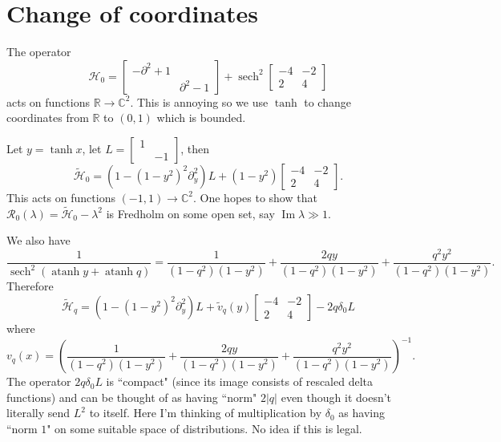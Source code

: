 \documentclass[12pt]{report}
\newcommand{\RR}{\mathbb{R}}
\newcommand{\CC}{\mathbb{C}}
\DeclareMathOperator{\atanh}{atanh}
\DeclareMathOperator{\sech}{sech}
\renewcommand{\Im}{\operatorname{Im}}
\theoremstyle{definition}
\begin{document}
\section{Change of coordinates}
The operator
$$\mathcal H_0 = \begin{bmatrix}-\partial^2 + 1 \\&\partial^2 - 1\end{bmatrix} + \sech^2 \begin{bmatrix}-4 & -2\\2 & 4\end{bmatrix}$$
acts on functions $\RR \to \CC^2$. This is annoying so we use $\tanh$ to change coordinates from $\RR$ to $(0, 1)$ which is bounded.

Let $y = \tanh x$, let $L = \begin{bmatrix}1 & \\ &-1\end{bmatrix}$, then
$$\mathcal{\tilde H}_0 = \left(1 - (1 - y^2)^2 \partial_y^2\right)L + (1 - y^2)\begin{bmatrix}-4 & -2\\2 & 4\end{bmatrix}.$$
This acts on functions $(-1, 1) \to \CC^2$.
One hopes to show that $\mathcal R_0(\lambda) = \mathcal{\tilde H}_0 - \lambda^2$ is Fredholm on some open set, say $\Im \lambda \gg 1$.

We also have
$$\frac{1}{\sech^2(\atanh y + \atanh q)} = \frac{1}{(1 - q^2)(1 - y^2)} + \frac{2qy}{(1 - q^2)(1 - y^2)} + \frac{q^2y^2}{(1 - q^2)(1 - y^2)}.$$
Therefore
$$\mathcal{\tilde H}_q = \left(1 - (1 - y^2)^2 \partial_y^2\right)L + \tilde v_q(y) \begin{bmatrix}-4 & -2\\2 & 4\end{bmatrix} - 2q\delta_0 L$$
where
$$v_q(x) = \left(\frac{1}{(1 - q^2)(1 - y^2)} + \frac{2qy}{(1 - q^2)(1 - y^2)} + \frac{q^2y^2}{(1 - q^2)(1 - y^2)}\right)^{-1}.$$
The operator $2q\delta_0L$ is ``compact" (since its image consists of rescaled delta functions) and can be thought of as having ``norm" $2|q|$ even though it doesn't literally send $L^2$ to itself.
Here I'm thinking of multiplication by $\delta_0$ as having ``norm $1$" on some suitable space of distributions. No idea if this is legal.
\end{document}
